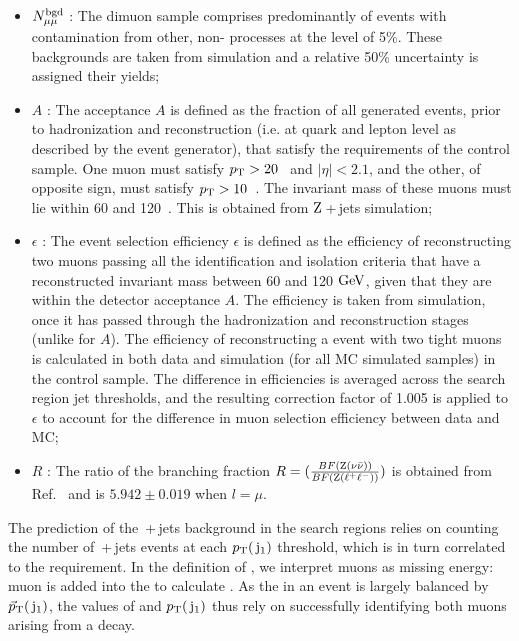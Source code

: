 \begin{itemize}

\item $ N^{\rm bgd}_{\mu\mu}$ : The dimuon sample comprises predominantly of \zmumu{} events with contamination from other, non-\zmumubr{} processes at the level of 5\%. These backgrounds are taken from simulation and a relative 50\% uncertainty is assigned their yields; 

\item $A$ : The acceptance $A$ is defined as the fraction of all generated events, prior to hadronization and reconstruction 
(i.e. at quark and lepton level as described by the event generator), that satisfy the requirements of the control sample. 
One muon must satisfy $p_{\text{T}} > 20$~\GeV{} and $|\eta| < 2.1$, and the other, of opposite sign, must satisfy $p_{\text{T}} > 10$~\GeV{}. The invariant mass of these muons must lie within 60 \GeV{} and 120~\GeV{}. This is obtained from $\mathrm{Z}${}\,+\,jets simulation;

\item $\epsilon$ : The event selection efficiency $\epsilon$ is defined as the efficiency of reconstructing two muons passing all the identification and isolation criteria that have a reconstructed invariant mass between 60 and 120 $\mathrm{GeV}$, given that they are within the detector acceptance $A$. 
The efficiency is taken from simulation, once it has passed through the hadronization and reconstruction stages (unlike for $A$).
%
The efficiency of reconstructing a \zmumubr{} event with two tight muons is calculated in both data and simulation (for all MC simulated samples) in the \zmumu{} control sample. The difference in efficiencies is averaged across the search region jet \pt{} thresholds, and the resulting correction factor of 1.005 is applied to $\epsilon$ to account for the difference in muon selection efficiency between data and MC;

\item $R$ : The ratio of the branching fraction $R = (\frac{BF(\mathrm{Z} ( \nu \bar{\nu} ))}{BF(\mathrm{Z} ( \ell^{+} \ell^{-} ))})$ is obtained from Ref.~\cite{PDG} and 
   is $5.942\pm 0.019$ when $l=\mu$. 
\end{itemize}
 
The prediction of the \znunubr{}\,+\,jets background in the search regions relies on counting the number of 
\zmumubr{}\,+\,jets events at each $p_{\text{T}}(\,\mathrm{j}_1)$ threshold, which is in turn
correlated to the \METmu requirement.
In the definition of \METmu, we interpret muons as missing energy: 
muon \ptv is added into the \METv to calculate \METvmu.
As the \METvmu in an event is largely balanced by $\vec{p}_{\text{T}}(\,\mathrm{j}_1)$, 
the values of \METmu and $p_{\text{T}}(\,\mathrm{j}_1)$ thus rely on successfully 
identifying both muons arising from a \zmumu decay. 

